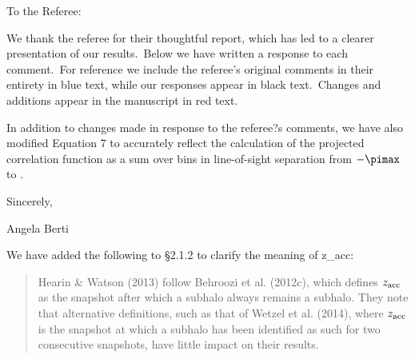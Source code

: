 \documentclass[12pt,preprint]{aastex}
\begin{document}
\thispagestyle{plain}

\begin{flushleft}
To the Referee:

We thank the referee for their thoughtful report, which has led to a clearer presentation of our results.\ Below we have written a response to each comment.\ For reference we include the referee's original comments in their entirety in blue text, while our responses appear in black text.\ Changes and additions appear in the manuscript in {\color{red} red} text.

In addition to changes made in response to the referee?s comments, we have also modified Equation 7 to accurately reflect the calculation of the projected correlation function as a sum over bins in line-of-sight separation from $-\pimax$ to \pimax.

\end{flushleft}
\noindent Sincerely,

\noindent Angela Berti
\vspace{0.3in}

\noindent {}

We have added the following to \S2.1.2 to clarify the meaning of z\_acc:

\begin{quotation}
Hearin \& Watson (2013) follow Behroozi et al. (2012c), which defines $z_{\rm acc}$ as the snapshot after which a subhalo always remains a subhalo. They note that alternative definitions, such as that of Wetzel et al. (2014), where $z_{\rm acc}$ is the snapshot at which a subhalo has been identified as such for two consecutive snapshots, have little impact on their results.
\end{quotation}
\end{document}
